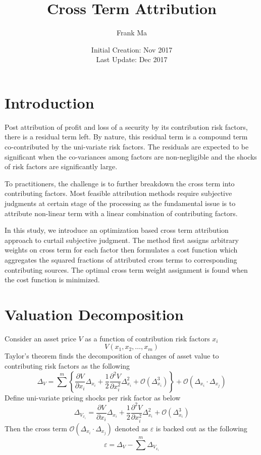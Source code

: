 \documentclass{article}
\title{Cross Term Attribution}
\author{Frank Ma}
\date{Initial Creation: Nov 2017 \\ Last Update: Dec 2017}
\begin{document}
\maketitle


\section{Introduction}
Post attribution of profit and loss of a security by its contribution risk factors, there is a residual term left. By nature, this residual term is a compound term co-contributed by the uni-variate risk factors. The residuals are expected to be significant when the co-variances among factors are non-negligible and the shocks of risk factors are significantly large.

To practitioners, the challenge is to further breakdown the cross term into contributing factors. Most feasible attribution methods require subjective judgments at certain stage of the processing as the fundamental issue is to attribute non-linear term with a linear combination of contributing factors.

In this study, we introduce an optimization based cross term attribution approach to curtail subjective judgment. The method first assigns arbitrary weights on cross term for each factor then formulates a cost function which aggregates the squared fractions of attributed cross terms to corresponding contributing sources. The optimal cross term weight assignment is found when the cost function is minimized.


\section{Valuation Decomposition}
Consider an asset price $ V $ as a function of contribution risk factors $ x_i $
\begin{equation}
    V(x_1, x_2, \dots, x_m)
\end{equation}
Taylor's theorem finds the decomposition of changes of asset value to contributing risk factors as the following
\begin{equation}
    \Delta_V = \sum^m{\left\{\frac{\partial V}{\partial x_i} \Delta_{x_i} + \frac{1}{2} \frac{\partial^2 V}{\partial x_i^2} \Delta_{x_i}^2 + \mathcal{O}\left(\Delta_{x_i}^3\right)\right\} + \mathcal{O}\left(\Delta_{x_i} \cdot \Delta_{x_j}\right)}
\end{equation}
Define uni-variate pricing shocks per risk factor as below
\begin{equation}
    \Delta_{V_{x_i}} = \frac{\partial V}{\partial x_i} \Delta_{x_i} + \frac{1}{2} \frac{\partial^2 V}{\partial x_i^2} \Delta_{x_i}^{2} + \mathcal{O}\left(\Delta_{x_i}^{3}\right)
\end{equation}
Then the cross term $ \mathcal{O}\left(\Delta_{x_i} \cdot \Delta_{x_j}\right) $ denoted as $ \varepsilon $ is backed out as the following
\begin{equation}
    \varepsilon = \Delta_V - \sum^m{\Delta_{V_{x_i}}}
\end{equation}
\end{document}
